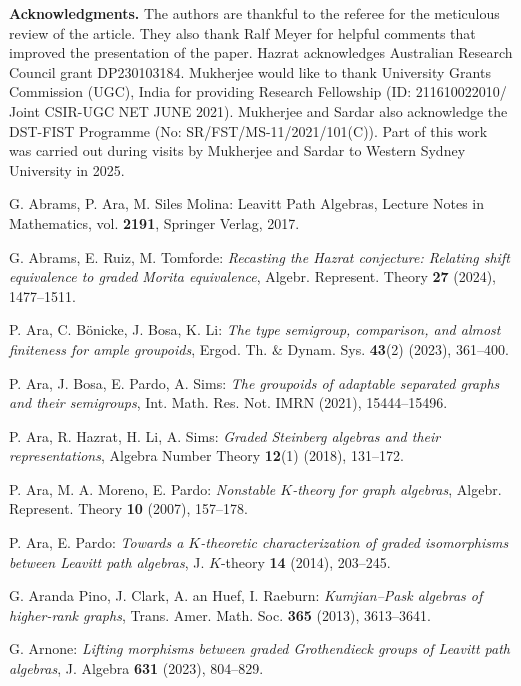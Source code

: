 \documentclass[12pt]{amsart}
\theoremstyle{definition}
\theoremstyle{remark}
\begin{document}
{\bf Acknowledgments.} The authors are thankful to the referee for the meticulous review of the article. They also thank Ralf Meyer for helpful comments that improved the presentation of the paper. Hazrat acknowledges Australian Research Council grant DP230103184. Mukherjee would like to thank University Grants Commission (UGC), India for providing Research Fellowship (ID: 211610022010/ Joint CSIR-UGC NET JUNE 2021). Mukherjee and Sardar also acknowledge the DST-FIST Programme (No: SR/FST/MS-11/2021/101(C)). Part of this work was carried out during visits by Mukherjee and Sardar to Western Sydney University in 2025.
\begin{thebibliography}{}

G. Abrams, P. Ara, M. Siles Molina: Leavitt Path Algebras, Lecture Notes in Mathematics, vol. \textbf{2191}, Springer Verlag, 2017.

G. Abrams, E. Ruiz, M. Tomforde: \emph{Recasting the Hazrat conjecture: Relating shift equivalence to graded Morita equivalence}, Algebr. Represent. Theory \textbf{27} (2024), 1477--1511.

P. Ara, C. B\"{o}nicke, J. Bosa, K. Li: \emph{The type semigroup, comparison, and almost finiteness for ample groupoids}, Ergod. Th. \& Dynam. Sys. \textbf{43}(2) (2023), 361--400.

P. Ara, J. Bosa, E. Pardo, A. Sims: \emph{The groupoids of adaptable separated graphs and their semigroups}, Int. Math. Res. Not. IMRN (2021), 15444--15496.

P. Ara, R. Hazrat, H. Li, A. Sims: \emph{Graded Steinberg algebras and their representations}, Algebra Number Theory \textbf{12}(1) (2018), 131--172.

P. Ara, M. A. Moreno, E. Pardo: \emph{Nonstable $K$-theory for graph algebras}, Algebr. Represent. Theory \textbf{10} (2007), 157--178.

P. Ara, E. Pardo: \emph{Towards a $K$-theoretic characterization of graded isomorphisms between Leavitt path algebras}, J. $K$-theory {\bf 14} (2014), 
203--245. 

G. Aranda Pino, J. Clark, A. an Huef, I. Raeburn: \emph{Kumjian--Pask algebras of higher-rank graphs}, Trans. Amer. Math. Soc. \textbf{365} (2013), 3613--3641.

G. Arnone: \emph{Lifting morphisms between graded Grothendieck groups of Leavitt path algebras}, J. Algebra \textbf{631} (2023), 804--829.


\end{thebibliography}
\end{document}
